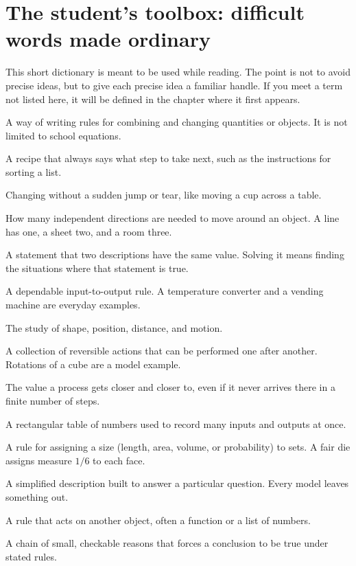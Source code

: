 \documentclass[11pt,oneside]{book}
\begin{document}
\chapter*{The student's toolbox: difficult words made ordinary}
This short dictionary is meant to be used while reading. The point is not to avoid precise ideas, but to give each precise idea a familiar handle. If you meet a term not listed here, it will be defined in the chapter where it first appears.

\begin{description}[leftmargin=3.0cm,style=nextline]
\item[Algebra] A way of writing rules for combining and changing quantities or objects. It is not limited to school equations.
\item[Algorithm] A recipe that always says what step to take next, such as the instructions for sorting a list.
\item[Continuous] Changing without a sudden jump or tear, like moving a cup across a table.
\item[Dimension] How many independent directions are needed to move around an object. A line has one, a sheet two, and a room three.
\item[Equation] A statement that two descriptions have the same value. Solving it means finding the situations where that statement is true.
\item[Function] A dependable input-to-output rule. A temperature converter and a vending machine are everyday examples.
\item[Geometry] The study of shape, position, distance, and motion.
\item[Group] A collection of reversible actions that can be performed one after another. Rotations of a cube are a model example.
\item[Limit] The value a process gets closer and closer to, even if it never arrives there in a finite number of steps.
\item[Matrix] A rectangular table of numbers used to record many inputs and outputs at once.
\item[Measure] A rule for assigning a size (length, area, volume, or probability) to sets. A fair die assigns measure $1/6$ to each face.
\item[Model] A simplified description built to answer a particular question. Every model leaves something out.
\item[Operator] A rule that acts on another object, often a function or a list of numbers.
\item[Proof] A chain of small, checkable reasons that forces a conclusion to be true under stated rules.

\end{description}
\end{document}
